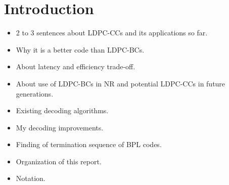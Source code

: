 \section{Introduction}
\begin{itemize}
  \item 2 to 3 sentences about LDPC-CCs and its applications so far.
  \item Why it is a better code than LDPC-BCs.
  \item About latency and efficiency trade-off.
  \item About use of LDPC-BCs in NR and potential LDPC-CCs in future generations.
  \item Existing decoding algorithms.
  \item My decoding improvements.
  \item Finding of termination sequence of BPL codes.
  \item Organization of this report.
  \item Notation.
\end{itemize}